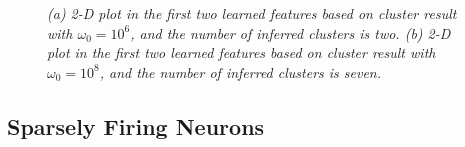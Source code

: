 \documentclass[journal]{IEEEtran}
\begin{document}
\begin{figure}[!htbp]
\centering

  \caption{\label{fig:Tuning_Parameter}\small \emph{
(a) 2-D plot in the first two learned features based on cluster result with $\omega_0=10^{6}$, and the number of inferred clusters is two. (b) 2-D plot in the first two learned features based on cluster result with $\omega_0=10^{8}$, and the number of inferred clusters is seven.
   }}
\end{figure}



\subsection{Sparsely Firing Neurons} \label{sec:sparse}
\end{document}
